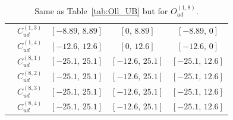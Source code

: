 \begin{table}[tbp]
{\begin{tabular}{ccccc}
        & $C_{ud}^{(1,3)}$ & $[-8.89,\, 8.89]$ & $[0,\, 8.89]$     & $[-8.89,\, 0]$    \\
        & $C_{ud}^{(1,4)}$ & $[-12.6,\, 12.6]$ & $[0,\, 12.6]$     & $[-12.6,\, 0]$    \\
        & $C_{ud}^{(8,1)}$ & $[-25.1,\, 25.1]$ & $[-12.6,\, 25.1]$ & $[-25.1,\, 12.6]$ \\
        & $C_{ud}^{(8,2)}$ & $[-25.1,\, 25.1]$ & $[-12.6,\, 25.1]$ & $[-25.1,\, 12.6]$ \\
        & $C_{ud}^{(8,3)}$ & $[-25.1,\, 25.1]$ & $[-12.6,\, 25.1]$ & $[-25.1,\, 12.6]$ \\
        & $C_{ud}^{(8,4)}$ & $[-25.1,\, 25.1]$ & $[-12.6,\, 25.1]$ & $[-25.1,\, 12.6]$ \\
    \bottomrule
\end{tabular}}
\caption{Same as Table~\ref{tab:Oll_UB} but for $O_{ud}^{(1,8)}$.}
\label{tab:Oud_UB}
\end{table}

